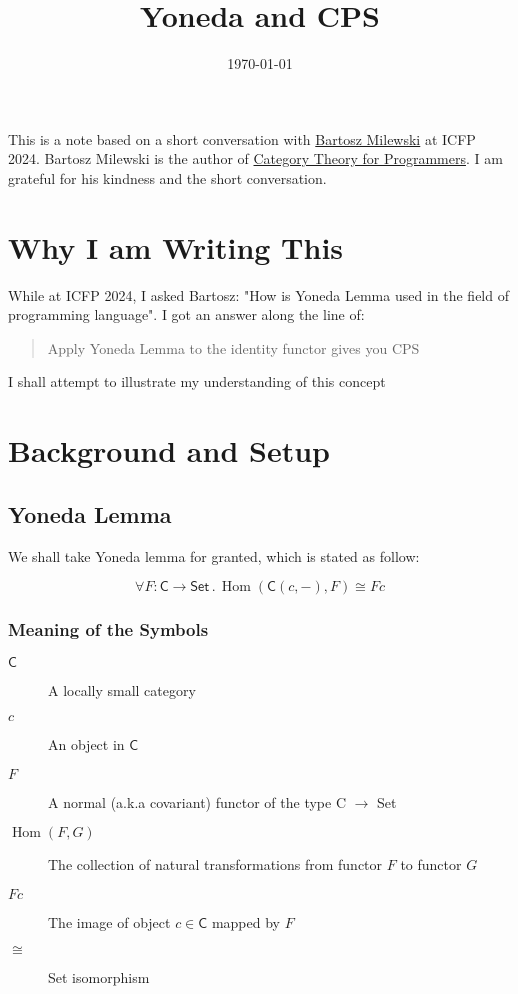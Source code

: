 \documentclass[11pt]{article}
\date{\today}
\title{Yoneda and CPS}
\begin{document}
\maketitle
\tableofcontents

This is a note based on a short conversation with \href{https://bartoszmilewski.com/}{Bartosz Milewski} at ICFP 2024.
Bartosz Milewski is the author of \href{https://bartoszmilewski.com/2014/10/28/category-theory-for-programmers-the-preface/}{Category Theory for Programmers}.
I am grateful for his kindness and the short conversation.

\section{Why I am Writing This}
\label{sec:org0ab80d1}
While at ICFP 2024, I asked Bartosz: "How is Yoneda Lemma used in the field of programming language".
I got an answer along the line of:
\begin{quote}
Apply Yoneda Lemma to the identity functor gives you CPS
\end{quote}

I shall attempt to illustrate my understanding of this concept

\section{Background and Setup}
\label{sec:orgb8d5dd3}

\subsection{Yoneda Lemma}
\label{sec:org77c9f61}
We shall take Yoneda lemma for granted, which is stated as follow:

\[\forall F : \mathsf C \to \mathsf{Set} \,.\,  \operatorname{Hom}(\mathsf C (c, {-}), F) \cong F c \]

\subsubsection{Meaning of the Symbols}
\label{sec:orgb044529}
\begin{description}
\item[{\(\mathsf C\)}] A locally small category
\item[{\(c\)}] An object in \(\mathsf C\)
\item[{\(F\)}] A normal (a.k.a covariant) functor of the type C \(\to\) Set
\item[{\(\operatorname{Hom}(F, G)\)}] The collection of natural transformations from functor \(F\) to functor \(G\)
\item[{\(F c\)}] The image of object \(c \in \mathsf C\) mapped by \(F\)
\item[{\(\cong\)}] Set isomorphism
\end{description}
\end{document}
